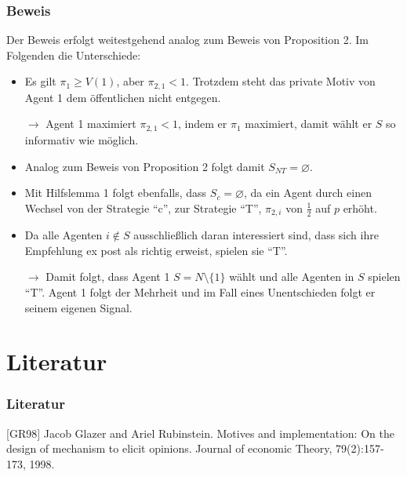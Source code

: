 \documentclass{beamer}
\begin{document}
\begin{frame}\frametitle{Beweis}
\vspace{0.4cm}
Der Beweis erfolgt weitestgehend analog zum Beweis von Proposition 2. Im Folgenden die Unterschiede:
\begin{itemize}
\item Es gilt $\pi_1 \geq V(1)$, aber $\pi_{2,1}<1$. Trotzdem steht das private Motiv von Agent 1 dem \"offentlichen nicht entgegen.
\item [$\rightarrow$] Agent 1 maximiert $\pi_{2,1}<1$, indem er $\pi_1$ maximiert, damit w\"ahlt er $S$ so informativ wie m\"oglich.
\item Analog zum Beweis von Proposition 2 folgt damit $S_{NT}=\varnothing$.
\item Mit Hilfslemma 1 folgt ebenfalls, dass $S_c=\varnothing$, da ein Agent durch einen Wechsel von der Strategie ``c'', zur Strategie ``T'', $\pi_{2,i}$ von $\frac{1}{2}$ auf $p$ erh\"oht.
\item Da alle Agenten $i\notin S$ ausschlie{\ss}lich daran interessiert sind, dass sich ihre Empfehlung ex post als richtig erweist, spielen sie ``T''.
\item [$\rightarrow$] Damit folgt, dass Agent 1 $S=N\setminus \{1\}$ w\"ahlt und alle Agenten in $S$ spielen ``T''. Agent 1 folgt der Mehrheit und im Fall eines Unentschieden folgt er seinem eigenen Signal.
\end{itemize}
\end{frame}









\section{Literatur}
\begin{frame}
\frametitle{Literatur}
\footnotesize{
\begin{thebibliography}{99}
 [GR98] Jacob Glazer and Ariel Rubinstein. Motives and implementation: On the design of mechanism to elicit opinions. Journal of economic Theory, 79(2):157-173, 1998.
\end{thebibliography}
}
\end{frame}
\end{document}
